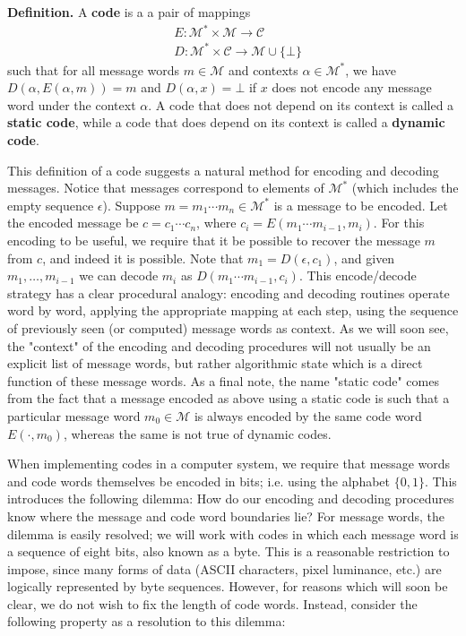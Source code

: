 \documentclass[twoside]{article}
\begin{document}
\begin{multicols}{2}
\vspace{0.5em}
\noindent \textbf{Definition.} A \textbf{code} is a a pair of mappings
\begin{align*}
&E: \mathcal{M}^* \times \mathcal{M} \to \mathcal{C}\\
&D: \mathcal{M}^* \times \mathcal{C} \to \mathcal{M} \cup \{\bot\}
\end{align*}
such that for all message words $m \in \mathcal{M}$ and contexts $\alpha \in \mathcal{M}^*$, we have $D(\alpha, E(\alpha, m)) = m$ and $D(\alpha, x) = \bot$ if $x$ does not encode any message word under the context $\alpha$. A code that does not depend on its context is called a \linebreak \textbf{static code}, while a code that does depend on its context is called a \textbf{dynamic code}.

\vspace{0.5em}
This definition of a code suggests a natural method for encoding and decoding messages. Notice that messages correspond to elements of $\mathcal{M}^*$ (which includes the empty sequence $\epsilon$). Suppose $m = m_1\cdots m_n \in \mathcal{M}^*$ is a message to be encoded. Let the encoded message be $c = c_1 \cdots c_n$, where $c_i = E(m_1\cdots m_{i-1}, m_i)$. For this encoding to be useful, we require that it be possible to recover the message $m$ from $c$, and indeed it is possible. Note that $m_1 = D(\epsilon, c_1)$, and given $m_1, \dots, m_{i-1}$ we can decode $m_i$ as $D(m_1 \cdots m_{i-1}, c_i)$. This encode/decode strategy has a clear procedural analogy: encoding and decoding routines operate word by word, applying the appropriate mapping at each step, using the sequence of previously seen (or computed) message words as context. As we will soon see, the "context" of the encoding and decoding procedures will not usually be an explicit list of message words, but rather algorithmic state which is a direct function of these message words. As a final note, the name "static code" comes from the fact that a message encoded as above using a static code is such that a particular message word $m_0 \in \mathcal{M}$ is always encoded by the same code word $E(\cdot, m_0)$, whereas the same is not true of dynamic codes.

When implementing codes in a computer system, we require that message words and code words themselves be encoded in bits; i.e. using the alphabet $\{0, 1\}$. This introduces the following dilemma: How do our encoding and decoding procedures know where the message and code word boundaries lie? For message words, the dilemma is easily resolved; we will work with codes in which each message word is a sequence of eight bits, also known as a byte. This is a reasonable restriction to impose, since many forms of data (ASCII characters, pixel luminance, etc.) are logically represented by byte sequences. However, for reasons which will soon be clear, we do not wish to fix the length of code words. Instead, consider the following property as a resolution to this dilemma:


\end{multicols}
\end{document}
